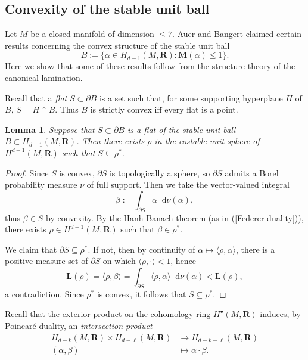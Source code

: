 \documentclass[reqno,11pt]{amsart}
\newcommand{\RR}{\mathbf{R}}
\newcommand*\dif{\mathop{}\!\mathrm{d}}
\newcommand{\Mass}{\mathbf M}
\newcommand{\Comass}{\mathbf L}
\newcommand{\dfn}[1]{\emph{#1}\index{#1}}
\newtheorem{lemma}[theorem]{Lemma}
\theoremstyle{definition}
\numberwithin{equation}{section}
\begin{document}
\subsection{Convexity of the stable unit ball}\label{convexity sec}
Let $M$ be a closed manifold of dimension $\leq 7$.
Auer and Bangert \cite{Auer01} claimed certain results concerning the convex structure of the stable unit ball
$$B := \{\alpha \in H_{d - 1}(M, \RR): \Mass(\alpha) \leq 1\}.$$
Here we show that some of these results follow from the structure theory of the canonical lamination.

Recall that a \dfn{flat} $S \subset \partial B$ is a set such that, for some supporting hyperplane $H$ of $B$, $S = H \cap B$.
Thus $B$ is strictly convex iff every flat is a point.

\begin{lemma}
Suppose that $S \subset \partial B$ is a flat of the stable unit ball $B \subset H_{d - 1}(M, \RR)$.
Then there exists $\rho$ in the costable unit sphere of $H^{d - 1}(M, \RR)$ such that $S \subseteq \rho^*$.
\end{lemma}
\begin{proof}
Since $S$ is convex, $\partial S$ is topologically a sphere, so $\partial S$ admits a Borel probability measure $\nu$ of full support.
Then we take the vector-valued integral 
$$\beta := \int_{\partial S} \alpha \dif \nu(\alpha),$$
thus $\beta \in S$ by convexity.
By the Hanh-Banach theorem (as in (\ref{Federer duality})), there exists $\rho \in H^{d - 1}(M, \RR)$ such that $\beta \in \rho^*$.

We claim that $\partial S \subseteq \rho^*$.
If not, then by continuity of $\alpha \mapsto \langle \rho, \alpha\rangle$, there is a positive measure set of $\partial S$ on which $\langle \rho, \cdot\rangle < 1$, hence
$$\Comass(\rho) = \langle \rho, \beta\rangle = \int_{\partial S} \langle \rho, \alpha\rangle \dif \nu(\alpha) < \Comass(\rho),$$
a contradiction.
Since $\rho^*$ is convex, it follows that $S \subseteq \rho^*$.
\end{proof}

Recall that the exterior product on the cohomology ring $H^\bullet(M, \RR)$ induces, by Poincar\'e duality, an \dfn{intersection product}
\begin{align*}
H_{d - k}(M, \RR) \times H_{d - \ell}(M, \RR) &\to H_{d - k - \ell}(M, \RR) \\
(\alpha, \beta) &\mapsto \alpha \cdot \beta.
\end{align*}
\end{document}
